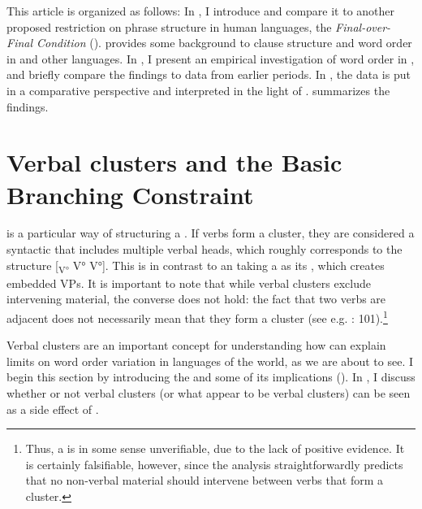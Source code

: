\documentclass[output=paper, colorlinks, citecolor=brown]{langscibook}
\begin{document}
This article is organized as follows: In , I introduce  and compare it to another proposed restriction on phrase structure in human languages, the \textit{Final-over-Final Condition} (\citealt{BiberauerEtAl2014,SheehanEtAl2017}).  provides some background to clause structure and  word order in  and other  languages. In , I present an empirical investigation of  word order in , and briefly compare the findings to data from earlier periods. In , the  data is put in a comparative perspective and interpreted in the light of .  summarizes the findings.


\section{Verbal clusters and the Basic Branching Constraint}\label{sec:sangfelt:2}

 is a particular way of structuring a . If verbs form a cluster, they are considered a syntactic  that includes multiple verbal heads, which roughly corresponds to the structure [\textsubscript{V°} V° V°]. This is in contrast to an  taking a  as its , which creates embedded VPs. It is important to note that while verbal clusters exclude intervening material, the converse does not hold: the fact that two verbs are adjacent does not necessarily mean that they form a cluster (see e.g. \citealt{Sheehan2017Final}: 101).\footnote{Thus, a  is in some sense unverifiable, due to the lack of positive evidence. It is certainly falsifiable, however, since the analysis straightforwardly predicts that no non-verbal material should intervene between verbs that form a cluster.}


Verbal clusters are an important concept for understanding how  can explain limits on word order variation in languages of the world, as we are about to see. I begin this section by introducing the  and some of its implications (). In , I discuss whether or not verbal clusters (or what appear to be verbal clusters) can be seen as a side effect of .
\end{document}

